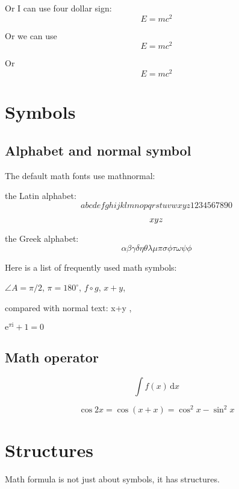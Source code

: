 \documentclass{article}
\begin{document}
Or I can use four dollar sign: $$E=mc^2$$       %

Or we can use
\[
E=mc^2      %
\]

Or
\begin{displaymath}
E=mc^2
\end{displaymath}


\section{Symbols}
\subsection{Alphabet and normal symbol}
The default math fonts use mathnormal:

the Latin alphabet:     %
$$a b c d e f g h i j k l m n o p q r s t u v w x y z 1 2 3 4 5 6 7 8 9 0$$

$$\mathnormal{x y z}$$

the Greek alphabet:     %
\[
\alpha \beta \gamma \delta \eta \theta \lambda \mu \pi \sigma \phi \tau \omega \psi \phi
\]

Here is a list of frequently used math symbols: 

$\angle A = \pi / 2$, 
$\pi = 180^\circ$,      %
$f \circ g$,        %
$x+y$,      %

compared with normal text: x+y  ,   %

$\mathrm{e}^{\pi\mathrm{i}} + 1 = 0$

\subsection{Math operator}
\[
\int f(x) \, \mathrm{d} x       %
\]

\[
\cos 2x = \cos(x+x) = \cos^2 x - \sin^2 x
\]


\section{Structures}
Math formula is not just about symbols, it has structures.
\end{document}
